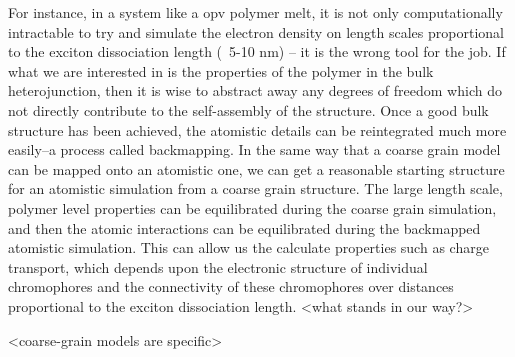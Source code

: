For instance, in a system like a opv polymer melt, it is not only computationally intractable to try and simulate the electron density on length scales proportional to the exciton dissociation length (~5-10 nm)\cite{Huang2010} -- it is the wrong tool for the job.
If what we are interested in is the properties of the polymer in the bulk heterojunction, then it is wise to abstract away any degrees of freedom which do not directly contribute to the self-assembly of the structure.
Once a good bulk structure has been achieved, the atomistic details can be reintegrated much more easily--a process called backmapping.
In the same way that a coarse grain model can be mapped onto an atomistic one, we can get a reasonable starting structure for an atomistic simulation from a coarse grain structure.
The large length scale, polymer level properties can be equilibrated during the coarse grain simulation, and then the atomic interactions can be equilibrated during the backmapped atomistic simulation.
This can allow us the calculate properties such as charge transport, which depends upon the electronic structure of individual chromophores and the connectivity of these chromophores over distances proportional to the exciton dissociation length.
<what stands in our way?>

<coarse-grain models are specific>

